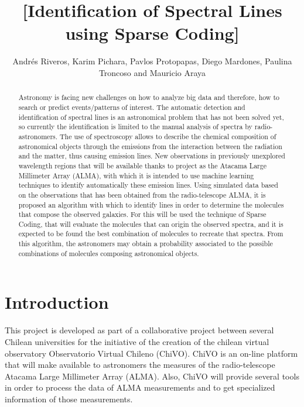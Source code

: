 \documentclass[twocolumn, draft]{emulateapj}
\begin{document}
\title{[Identification of Spectral Lines using Sparse Coding]}
\author{Andr\'es Riveros,
		Karim Pichara,
		Pavlos Protopapas,
		Diego Mardones,
		Paulina Troncoso and
		Mauricio Araya}

\begin{abstract}
Astronomy is facing new challenges on how to analyze big data and therefore, how to search or predict events/patterns of interest. The automatic detection and identification of spectral lines is an astronomical problem that has not been solved yet, so currently the identification is limited to the manual analysis of spectra by radio-astronomers. The use of spectroscopy allows to describe the chemical composition of astronomical objects through the emissions from the interaction between the radiation and the matter, thus causing emission lines. New observations in previously unexplored wavelength regions that will be available thanks to project as the Atacama Large Millimeter Array (ALMA), with which it is intended to use machine learning techniques to identify automatically these emission lines. Using simulated data based on the observations that has been obtained from the radio-telescope ALMA, it is proposed an algorithm with which to identify lines in order to determine the molecules that compose the observed galaxies. For this will be used the technique of Sparse Coding, that will evaluate the molecules that can origin the observed spectra, and it is expected to be found the best combination of molecules to recreate that spectra. From this algorithm, the astronomers may obtain a probability associated to the possible combinations of molecules composing astronomical objects.
\end{abstract}


\section{Introduction}

This project is developed as part of a collaborative project between several Chilean universities for the initiative of the creation of the chilean virtual observatory Observatorio Virtual Chileno (ChiVO). ChiVO is an on-line platform that will make available to astronomers the measures of the radio-telescope Atacama Large Millimeter Array (ALMA). Also, ChiVO will provide several tools in order to process the data of ALMA measurements and to get specialized information of those measurements.
\end{document}
